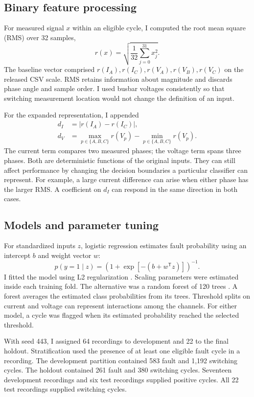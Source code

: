 \documentclass[11pt,conference,letterpaper]{IEEEtran}
\begin{document}
\subsection{Binary feature processing}
For measured signal $x$ within an eligible cycle, I computed the root mean square (RMS) over 32 samples,
\begin{equation} r(x)=\sqrt{\frac{1}{32}\sum_{j=0}^{31}x_j^2}. \end{equation}
The baseline vector comprised $r(I_A),r(I_C),r(V_A),r(V_B),r(V_C)$ on the released CSV scale. RMS retains information about magnitude and discards phase angle and sample order. I used busbar voltages consistently so that switching measurement location would not change the definition of an input.

For the expanded representation, I appended
\begin{align}
d_I &= |r(I_A)-r(I_C)|,\\
d_V &= \max_{p\in\{A,B,C\}}r(V_p)-\min_{p\in\{A,B,C\}}r(V_p).
\end{align}
The current term compares two measured phases; the voltage term spans three phases. Both are deterministic functions of the original inputs. They can still affect performance by changing the decision boundaries a particular classifier can represent. For example, a large current difference can arise when either phase has the larger RMS. A coefficient on $d_I$ can respond in the same direction in both cases.

\subsection{Models and parameter tuning}
For standardized inputs $z$, logistic regression estimates fault probability using an intercept $b$ and weight vector $w$:
\begin{equation}
\widehat p(y=1\mid z)=\left(1+\exp[-(b+w^{\mathsf T}z)]\right)^{-1}.
\end{equation}
I fitted the model using L2 regularization \cite{isl}. Scaling parameters were estimated inside each training fold. The alternative was a random forest of 120 trees \cite{forest}. A forest averages the estimated class probabilities from its trees. Threshold splits on current and voltage can represent interactions among the channels. For either model, a cycle was flagged when its estimated probability reached the selected threshold.

With seed 443, I assigned 64 recordings to development and 22 to the final holdout. Stratification used the presence of at least one eligible fault cycle in a recording. The development partition contained 583 fault and 1,192 switching cycles. The holdout contained 261 fault and 380 switching cycles. Seventeen development recordings and six test recordings supplied positive cycles. All 22 test recordings supplied switching cycles.
\end{document}
